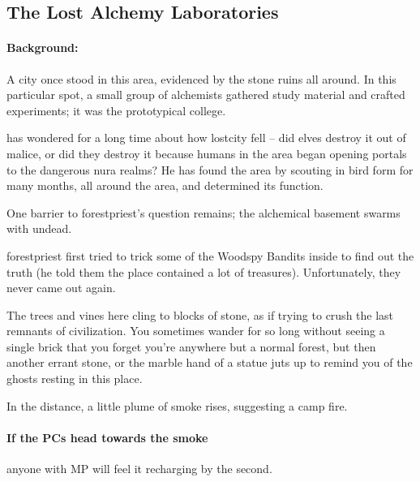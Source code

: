 \begin{multicols}{2}
\begin{itemize}
\end{itemize}

\subsection{The Lost Alchemy Laboratories}
\label{lostcity}

\paragraph{Background:}
A city once stood in this area, evidenced by the stone ruins all around.
In this particular spot, a small group of alchemists gathered study material and crafted experiments; it was the prototypical \gls{college}.

 has wondered for a long time about how \gls{lostcity} fell -- did elves destroy it out of malice, or did they destroy it because humans in the area began opening portals to the dangerous nura realms?
He has found the area by scouting in bird form for many months, all around the area, and determined its function.

One barrier to \gls{forestpriest}'s question remains; the alchemical basement swarms with undead.

\Gls{forestpriest} first tried to trick some of the Woodspy Bandits inside to find out the truth (he told them the place contained a lot of treasures).
Unfortunately, they never came out again.

\begin{boxtext}

  The trees and vines here cling to blocks of stone, as if trying to crush the last remnants of civilization.
  You sometimes wander for so long without seeing a single brick that you forget you're anywhere but a normal forest, but then another errant stone, or the marble hand of a statue juts up to remind you of the ghosts resting in this place.

  In the distance, a little plume of smoke rises, suggesting a camp fire.

\end{boxtext}

\paragraph{If the PCs head towards the smoke}
anyone with MP will feel it recharging by the second.

\label{fallen_tower}


\end{multicols}
